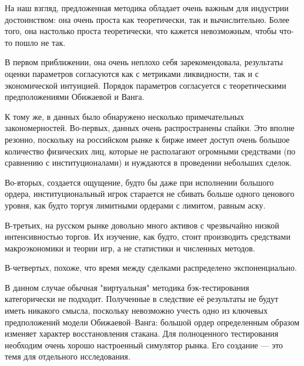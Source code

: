 \conclusion %


На наш взгляд, предложенная методика обладает очень важным для индустрии достоинством: 
она очень проста как теоретически, так и вычислительно. Более того, она настолько проста теоретически,
что кажется невозможным, чтобы что-то пошло не так.
\par
В первом приближении, она очень неплохо себя зарекомендовала, результаты оценки параметров согласуются
как с метриками ликвидности, так и с экономической интуицией. Порядок параметров согласуется с теоретическими
предположениями Обижаевой и Ванга.
\par
К тому же, в данных было обнаружено несколько примечательных закономерностей.
Во-первых, данных очень распространены спайки. Это вполне резонно, поскольку на российском рынке к бирже имеет доступ
очень большое количество физических лиц, которые не располагают огромными средствами (по сравнению с институционалами)
и нуждаются в проведении небольших сделок.
\par
Во-вторых, создается ощущение, будто бы даже при исполнении большого ордера, институциональный игрок старается не сбивать
больше одного ценового уровня, как будто торгуя лимитными ордерами с лимитом, равным аску.
\par
В-третьих, на русском рынке довольно много активов с чрезвычайно низкой интенсивностью торгов. Их изучение, как будто,
стоит производить средствами макроэкономики и теории игр, а не статистики и численных методов.
\par
В-четвертых, похоже, что время между сделками распределено экспоненциально.
\par
В данном случае обычная "виртуальная" методика бэк-тестирования категорически не подходит. Полученные в следствие её результаты
не будут иметь никакого смысла, поскольку невозможно учесть одно из ключевых предположений модели Обижаевой--Ванга:
большой ордер определенным образом изменяет характер восстановления стакана. Для полноценного тестирования необходим 
очень хорошо настроенный симулятор рынка. Его создание --- это темя для отдельного исследования.